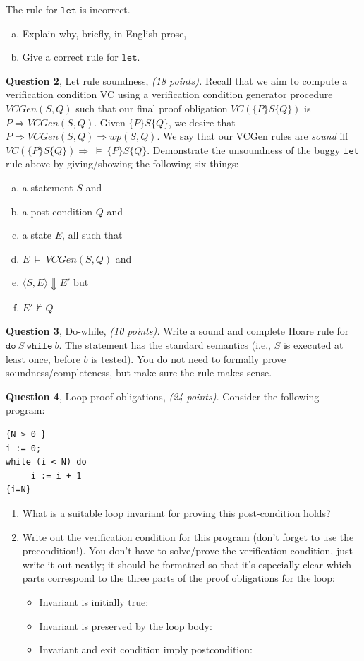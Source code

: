 \documentclass[11pt]{article}
\newcommand{\question}[3]
  {\bigskip \noindent
  {\bf Question #1}, {#2}, {\it(#3 points).}}
\def\implies{\Rightarrow}
\begin{document}
\noindent The rule for $\mathtt{let}$ is incorrect. 

%
\begin{enumerate}[(a)] 
\item Explain why, briefly, in English prose, 
\item Give a correct rule for $\mathtt{let}$.  
\end{enumerate}

\question{2}{Let rule soundness}{18} Recall that we aim to compute a verification condition VC using 
a verification condition generator procedure $VCGen(S, Q)$ such that our final proof obligation 
$VC(\{P\}S\{Q\})$ is $P \implies VCGen(S, Q)$. Given $\{P\}S\{Q\}$, we desire that $P \Rightarrow VCGen(S, Q) \Rightarrow \textit{wp}(S,Q).$ We say that our VCGen rules are \emph{sound} iff 
$VC(\{P\}S\{Q\})\implies ~\vDash ~\{P\}S\{Q\}$. Demonstrate the unsoundness of the buggy $\mathtt{let}$ rule above by giving/showing the following six things:
%
\begin{enumerate}[(a)]
\item a statement $S$ and
\item a post-condition $Q$ and
 \item a state $E$, all such that
 \item $E ~\vDash~ VCGen(S, Q)$ and 
 \item $\langle S, E \rangle \Downarrow E'$ but
 \item $E' \nvDash Q$  
\end{enumerate}

\question{3}{Do-while}{10} Write a sound and complete Hoare rule for $\mathtt{do}~S~\mathtt{while}~b$. The statement has the standard semantics (i.e., $S$ is executed at least once, before $b$ is tested).  You do not need to formally prove soundness/completeness, but make sure the rule makes sense.

\question{4}{Loop proof obligations}{24}
Consider the following program:
\begin{verbatim}
{N > 0 }
i := 0;
while (i < N) do
     i := i + 1
{i=N}
\end{verbatim}

\begin{enumerate}
\item What is a suitable loop invariant for proving this post-condition holds? 
\item  Write out the verification condition for this program (don't forget to use the precondition!).  You don't have to solve/prove the verification condition, just write it out neatly; it should be formatted so that it's especially clear which parts correspond to the three parts of the proof obligations for the loop: 
\begin{itemize}
\item Invariant is initially true:
\item Invariant is preserved by the loop body:
\item Invariant and exit condition imply postcondition:
\end{itemize}
\end{enumerate}
\end{document}

